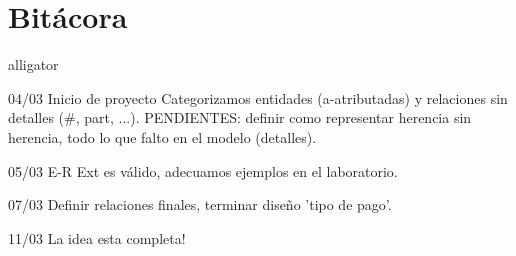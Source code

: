 \documentclass[10pt]{article}
\begin{document}
	
	
	
	\section{Bitácora}
	
	\begin{labeling}{alligator}
		\item [04/03] Inicio de proyecto Categorizamos entidades (a-atributadas) y relaciones sin detalles ($\#$, part, ...). PENDIENTES: definir como representar herencia sin herencia, todo lo que falto en el modelo (detalles).
		\item [05/03] E-R Ext es válido, adecuamos ejemplos en el laboratorio. 
		\item [07/03] Definir relaciones finales, terminar diseño 'tipo de pago'.
		\item [11/03] La idea esta completa!
	\end{labeling}
	
	
	
\end{document}
